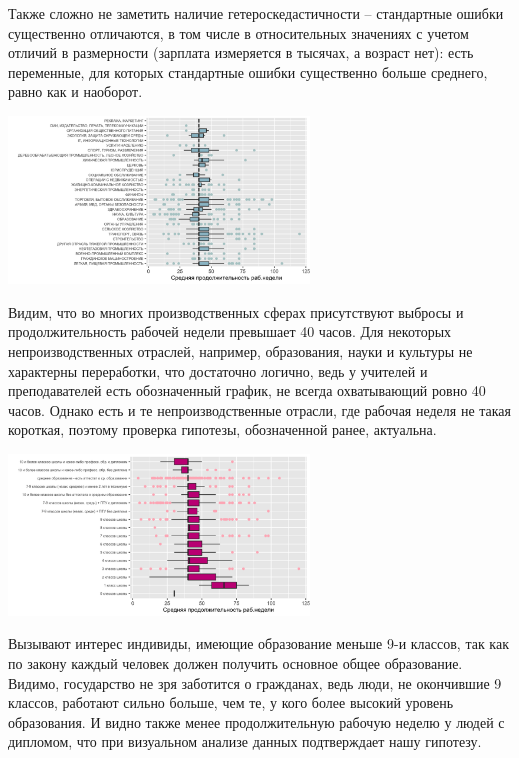 \documentclass[12pt, a4paper]{article}
\begin{document}
{Также сложно не заметить наличие гетероскедастичности – стандартные ошибки существенно отличаются, в том числе в относительных значениях с учетом отличий в размерности (зарплата измеряется в тысячах, а возраст нет): есть переменные, для которых стандартные ошибки существенно больше среднего, равно как и наоборот. 


\begin{center}
\includegraphics[width=0.6\textwidth]{structure}
\end{center}

Видим, что во многих производственных сферах присутствуют выбросы и продолжительность рабочей недели превышает 40 часов. Для некоторых непроизводственных отраслей, например, образования, науки и культуры не характерны переработки, что достаточно логично, ведь у учителей и преподавателей есть обозначенный график, не всегда охватывающий ровно 40 часов. Однако есть и те непроизводственные отрасли, где рабочая неделя не такая короткая, поэтому проверка гипотезы, обозначенной ранее, актуальна.

\begin{center}
	\includegraphics[width=0.6\textwidth]{educ}
\end{center}

Вызывают интерес индивиды, имеющие образование меньше 9-и классов, так как по закону каждый человек должен получить основное общее образование. Видимо, государство не зря заботится о гражданах, ведь люди, не окончившие 9 классов, работают сильно больше, чем те, у кого более высокий уровень образования. И видно также менее продолжительную рабочую неделю у людей с дипломом, что при визуальном анализе данных подтверждает нашу гипотезу.

}
\end{document}
